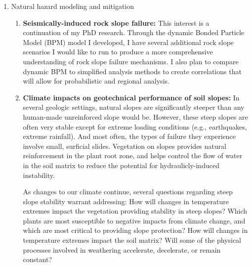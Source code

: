 \documentclass[10pt,letterpaper]{article}
\begin{document}
\begin{enumerate}
\item Natural hazard modeling and mitigation
\begin{enumerate}
\item \textbf{Seismically-induced rock slope failure:} This interest is a continuation of my PhD research.
Through the dynamic Bonded Particle Model (BPM) model I developed, I have several additional rock slope scenarios I would like to run to produce a more comprehensive understanding of rock slope failure mechanisms.
I also plan to compare dynamic BPM to simplified analysis methods to create correlations that will allow for probabilistic and regional analysis.
\item \textbf{Climate impacts on geotechnical performance of soil slopes:} In several geologic settings, natural slopes are significantly steeper than any human-made unreinforced slope would be. 
However, these steep slopes are often very stable except for extreme loading conditions (e.g., earthquakes, extreme rainfall).
And most often, the types of failure they experience involve small, surficial slides.
Vegetation on slopes provides natural reinforcement in the plant root zone, and helps control the flow of water in the soil matrix to reduce the potential for hydraulicly-induced instability.

As changes to our climate continue, several questions regarding steep slope stability warrant addressing:
How will changes in temperature extremes impact the vegetation providing stability in steep slopes? Which plants are most susceptible to negative impacts from climate change, and which are most critical to providing slope protection?
How will changes in temperature extremes impact the soil matrix? Will some of the physical processes involved in weathering accelerate, decelerate, or remain constant?


\end{enumerate}
\end{enumerate}
\end{document}

